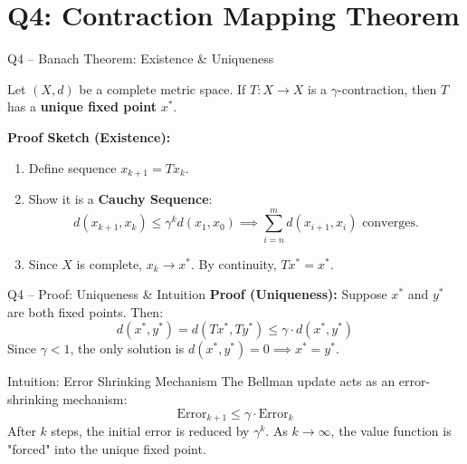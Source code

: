 \documentclass[aspectratio=169,12pt]{beamer}
\begin{document}
\section{Q4: Contraction Mapping Theorem}

\begin{frame}{Q4 -- Banach Theorem: Existence \& Uniqueness}
  \begin{theorem}
    Let $(X, d)$ be a complete metric space. If $T:X \to X$ is a $\gamma$-contraction, then $T$ has a \textbf{unique fixed point} $x^*$.
  \end{theorem}
  \textbf{Proof Sketch (Existence):}
  \begin{enumerate}
    \item Define sequence $x_{k+1} = T x_k$.
    \item Show it is a \textbf{Cauchy Sequence}:
    \[
      d(x_{k+1}, x_k) \leq \gamma^k d(x_1, x_0) \implies \sum_{i=n}^m d(x_{i+1}, x_i) \text{ converges.}
    \]
    \item Since $X$ is complete, $x_k \to x^*$. By continuity, $T x^* = x^*$.
  \end{enumerate}
\end{frame}

\begin{frame}{Q4 -- Proof: Uniqueness \& Intuition}
  \textbf{Proof (Uniqueness):}
  Suppose $x^*$ and $y^*$ are both fixed points. Then:
  \[
    d(x^*, y^*) = d(T x^*, T y^*) \leq \gamma \cdot d(x^*, y^*)
  \]
  Since $\gamma < 1$, the only solution is $d(x^*, y^*) = 0 \implies x^* = y^*$.

  \medskip
  \begin{block}{Intuition: Error Shrinking Mechanism}
    The Bellman update acts as an error-shrinking mechanism:
    \[
      \text{Error}_{k+1} \leq \gamma \cdot \text{Error}_{k}
    \]
    After $k$ steps, the initial error is reduced by $\gamma^k$. As $k \to \infty$, the value function is "forced" into the unique fixed point.
  \end{block}
\end{frame}
\end{document}
